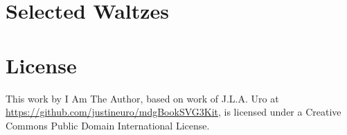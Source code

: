 \documentclass[a4paper,x11names,svgnames,10pt]{article}
\begin{document}
\newpage
\section{Selected Waltzes}
\vspace{-.10in}
{
\small
\topmargin -1.00in
\textheight 10.25in
	
}	

\newpage
\section{License}
This work by I Am The Author, based on work of J.L.A. Uro at  \url{https://github.com/justineuro/mdgBookSVG3Kit}, is licensed under a Creative Commons Public Domain International License.




 
\end{document}

